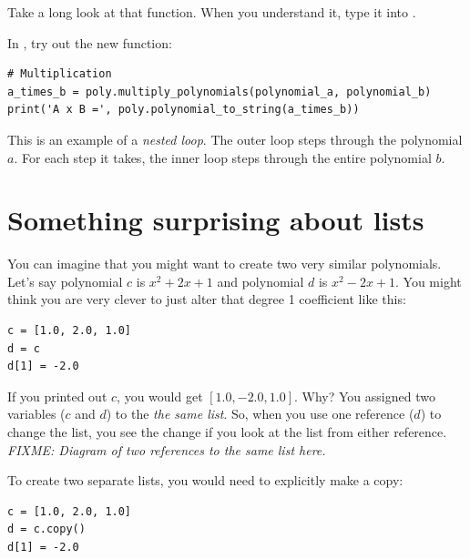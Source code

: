 Take a long look at that function.  When you understand it, type it into .

In , try out the new function:
\begin{verbatim}
# Multiplication
a_times_b = poly.multiply_polynomials(polynomial_a, polynomial_b)
print('A x B =', poly.polynomial_to_string(a_times_b))
\end{verbatim}

This is an example of a \emph{nested loop}. The outer loop steps
through the polynomial $a$. For each step it takes, the inner loop
steps through the entire polynomial $b$.

\section{Something surprising about lists}

You can imagine that you might want to create two very similar polynomials. Let's say polynomial $c$ is $x^2 + 2x + 1$ and polynomial $d$ is $x^2 -2x + 1$.  You might think you are very clever to just alter that degree 1 coefficient like this:
\begin{verbatim}
c = [1.0, 2.0, 1.0]
d = c
d[1] = -2.0
\end{verbatim}

If you printed out $c$, you would get $[1.0, -2.0, 1.0]$.  Why? You
assigned two variables ($c$ and $d$) to the \emph{the same list}.  So,
when you use one reference ($d$) to change the list, you see the
change if you look at the list from either reference. \emph{FIXME:
  Diagram of two references to the same list here.}

To create two separate lists, you would need to explicitly make a copy:
\begin{verbatim}
c = [1.0, 2.0, 1.0]
d = c.copy()
d[1] = -2.0
\end{verbatim}

